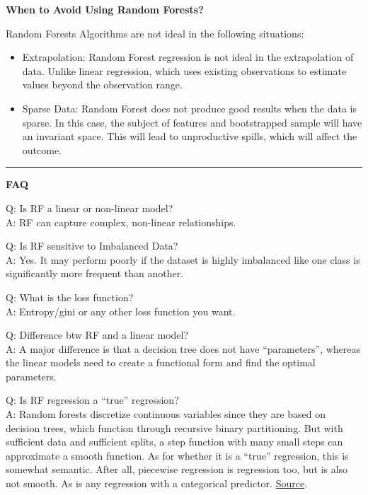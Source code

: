 \documentclass[
  a4paper,
  twoside,
  openright]{book}
\providecommand{\tightlist}{%
  \setlength{\itemsep}{0pt}\setlength{\parskip}{0pt}}
\theoremstyle{definition}
\theoremstyle{definition}
\theoremstyle{definition}
\theoremstyle{definition}
\theoremstyle{remark}
\begin{document}
\textbf{When to Avoid Using Random Forests?}

Random Forests Algorithms are not ideal in the following situations:

\begin{itemize}
\tightlist
\item
  Extrapolation: Random Forest regression is not ideal in the extrapolation of data. Unlike linear regression, which uses existing observations to estimate values beyond the observation range.
\item
  Sparse Data: Random Forest does not produce good results when the data is sparse. In this case, the subject of features and bootstrapped sample will have an invariant space. This will lead to unproductive spills, which will affect the outcome.
\end{itemize}

\begin{center}\rule{0.5\linewidth}{0.5pt}\end{center}

\textbf{FAQ}

Q: Is RF a linear or non-linear model?\\
A: RF can capture complex, non-linear relationships.

Q: Is RF sensitive to Imbalanced Data?\\
A: Yes. It may perform poorly if the dataset is highly imbalanced like one class is significantly more frequent than another.

Q: What is the loss function?\\
A: Entropy/gini or any other loss function you want.

Q: Difference btw RF and a linear model?\\
A: A major difference is that a decision tree does not have ``parameters'', whereas the linear models need to create a functional form and find the optimal parameters.

Q: Is RF regression a ``true'' regression?\\
A: Random forests discretize continuous variables since they are based on decision trees, which function through recursive binary partitioning. But with sufficient data and sufficient splits, a step function with many small steps can approximate a smooth function. As for whether it is a ``true'' regression, this is somewhat semantic. After all, piecewise regression is regression too, but is also not smooth. As is any regression with a categorical predictor. \href{https://stats.stackexchange.com/a/408284}{Source}.
\end{document}
